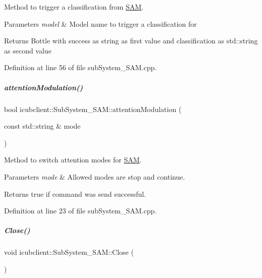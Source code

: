 Method to trigger a classification from \hyperlink{namespaceSAM}{S\+AM}. 


\begin{DoxyParams}{Parameters}
{\em model} & Model name to trigger a classification for \\
\hline
\end{DoxyParams}
\begin{DoxyReturn}{Returns}
Bottle with success as string as first value and classification as std\+::string as second value 
\end{DoxyReturn}


Definition at line 56 of file sub\+System\+\_\+\+S\+A\+M.\+cpp.

\mbox{\label{group__icubclient__subsystems_af5822eedc93b555f6004b61e6325e219}} 
\subparagraph{\texorpdfstring{attention\+Modulation()}{attentionModulation()}}
{\footnotesize\ttfamily bool icubclient\+::\+Sub\+System\+\_\+\+S\+A\+M\+::attention\+Modulation (\begin{DoxyParamCaption}\item[{const std\+::string \&}]{mode }\end{DoxyParamCaption})}



Method to switch attention modes for \hyperlink{namespaceSAM}{S\+AM}. 


\begin{DoxyParams}{Parameters}
{\em mode} & Allowed modes are {\ttfamily stop} and {\ttfamily continue}. \\
\hline
\end{DoxyParams}
\begin{DoxyReturn}{Returns}
true if command was send successful. 
\end{DoxyReturn}


Definition at line 23 of file sub\+System\+\_\+\+S\+A\+M.\+cpp.

\mbox{\label{group__icubclient__subsystems_a75b9591c2bbd9c20f1cd222d538c8c45}} 
\subparagraph{\texorpdfstring{Close()}{Close()}}
{\footnotesize\ttfamily void icubclient\+::\+Sub\+System\+\_\+\+S\+A\+M\+::\+Close (\begin{DoxyParamCaption}{ }\end{DoxyParamCaption})\hspace{0.3cm}{\ttfamily [virtual]}}



